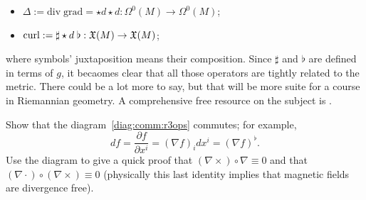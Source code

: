 \begin{example}
\begin{itemize}
    \item $\Delta := \mathrm{div}\; \mathrm{grad} = \star d \star d : \Omega^0(M) \to \Omega^0(M)$;
    \item $\mathrm{curl} := \sharp \star d\; \flat : \mathfrak{X}(M) \to \mathfrak{X}(M)$;
  \end{itemize}
  where symbols' juxtaposition means their composition.
  Since $\sharp$ and $\flat$ are defined in terms of $g$, it becaomes clear that all those operators are tightly related to the metric.
  There could be a lot more to say, but that will be more suite for a course in Riemannian geometry.
  A comprehensive free resource on the subject is \cite{book:derivations}.
\end{example}

\begin{exercise}
  Show that the diagram~\eqref{diag:comm:r3ops} commutes; for example,
  \begin{equation}
    df = \frac{\partial f}{\partial x^i} = (\nabla f)_i dx^i = (\nabla f)^\flat.
  \end{equation}
  Use the diagram to give a quick proof that $(\nabla\times)\circ \nabla \equiv 0$ and that $(\nabla\cdot) \circ (\nabla\times) \equiv 0$ (physically this last identity implies that magnetic fields are divergence free).
\end{exercise}

